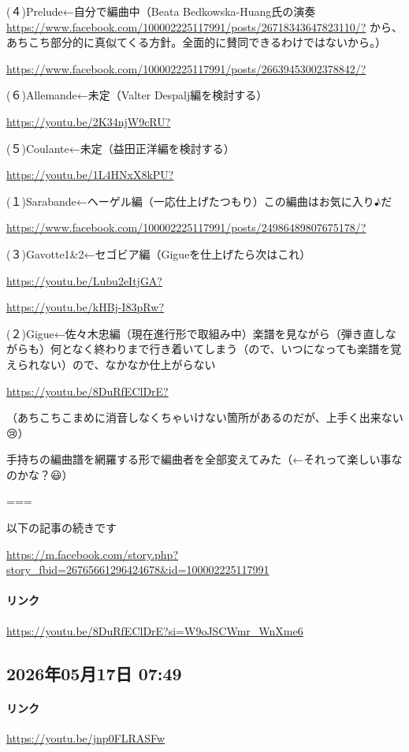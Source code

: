 (４)Prelude←自分で編曲中（Beata Bedkowska-Huang氏の演奏 \url{https://www.facebook.com/100002225117991/posts/26718343647823110/?} から、あちこち部分的に真似てくる方針。全面的に賛同できるわけではないから。）

\url{https://www.facebook.com/100002225117991/posts/26639453002378842/?}

(６)Allemande←未定（Valter Despalj編を検討する）

\url{https://youtu.be/2K34njW9cRU?}

(５)Coulante←未定（益田正洋編を検討する）

\url{https://youtu.be/1L4HNxX8kPU?}

(１)Sarabande←ヘーゲル編（一応仕上げたつもり）この編曲はお気に入り♪だ

\url{https://www.facebook.com/100002225117991/posts/24986489807675178/?}

(３)Gavotte1\&2←セゴビア編（Gigueを仕上げたら次はこれ）

\url{https://youtu.be/Lubu2eItjGA?}

\url{https://youtu.be/kHBj-I83pRw?}

(２)Gigue←佐々木忠編（現在進行形で取組み中）楽譜を見ながら（弾き直しながらも）何となく終わりまで行き着いてしまう（ので、いつになっても楽譜を覚えられない）ので、なかなか仕上がらない

\url{https://youtu.be/8DuRfEClDrE?}

（あちこちこまめに消音しなくちゃいけない箇所があるのだが、上手く出来ない😢）

手持ちの編曲譜を網羅する形で編曲者を全部変えてみた（←それって楽しい事なのかな？😃）

===

以下の記事の続きです

\url{https://m.facebook.com/story.php?story_fbid=26765661296424678&id=100002225117991}

\paragraph{リンク}
\url{https://youtu.be/8DuRfEClDrE?si=W9oJSCWmr_WnXme6}

\subsection*{2026年05月17日 07:49}

\paragraph{リンク}
\url{https://youtu.be/jnp0FLRASFw}

